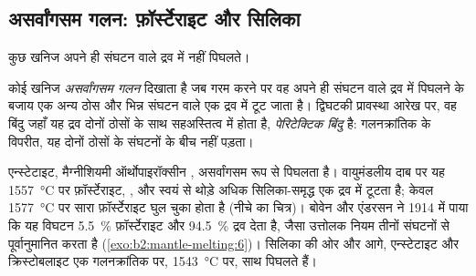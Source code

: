 \subsection*{असर्वांगसम गलन: फ़ॉर्स्टेराइट और सिलिका}

कुछ खनिज अपने ही संघटन वाले द्रव में नहीं पिघलते।

\begin{definition}\label{def:b2:mantle-melting:peritectic}
कोई खनिज \emph{असर्वांगसम गलन} दिखाता है जब
गरम करने पर वह अपने ही संघटन वाले द्रव में पिघलने के बजाय एक अन्य ठोस और भिन्न
संघटन वाले एक द्रव में टूट जाता है। द्विघटकी
प्रावस्था आरेख पर, वह बिंदु जहाँ यह द्रव दोनों ठोसों के साथ सहअस्तित्व में होता है,
\emph{पेरिटेक्टिक बिंदु} है: गलनक्रांतिक के विपरीत, यह
दोनों ठोसों के संघटनों के बीच नहीं पड़ता।
\end{definition}

एन्स्टेटाइट, मैग्नीशियमी ऑर्थोपाइरॉक्सीन , असर्वांगसम रूप से पिघलता है।
वायुमंडलीय दाब पर यह \qty{1557}{\celsius} पर फ़ॉर्स्टेराइट,
, और स्वयं से थोड़े अधिक सिलिका-समृद्ध एक द्रव में टूटता है; केवल
\qty{1577}{\celsius} पर सारा फ़ॉर्स्टेराइट घुल चुका होता है (नीचे का चित्र)। बोवेन
और एंडरसन ने 1914 में पाया कि यह विघटन \qty{5.5}{\percent}
फ़ॉर्स्टेराइट और \qty{94.5}{\percent} द्रव देता है, जैसा उत्तोलक नियम
तीनों संघटनों से पूर्वानुमानित करता है (\cref{exo:b2:mantle-melting:6})। सिलिका की ओर और आगे, एन्स्टेटाइट और
क्रिस्टोबलाइट एक गलनक्रांतिक पर, \qty{1543}{\celsius} पर, साथ पिघलते हैं।

